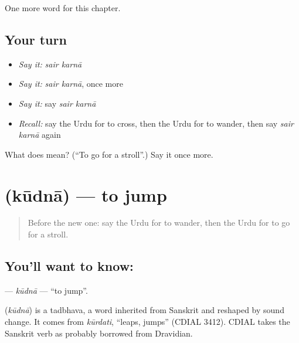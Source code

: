 \begin{grammarlens}[title={What you've built}]
One more word for this chapter.
\end{grammarlens}

\subsection*{Your turn}
\begin{itemize}
\raggedright
  \item \emph{Say it:} \emph{sair karnā}
  \item \emph{Say it:} \emph{sair karnā}, once more
  \item \emph{Say it:} say \emph{sair karnā}
  \item \emph{Recall:} say the Urdu for to cross, then the Urdu for to wander, then say \emph{sair karnā} again
\end{itemize}

\begin{tcolorbox}[breakable,colback=teal!4,colframe=teal!35!black,title={Before you move on}]
What does   mean? (\textquotedblleft{}To go for a stroll\textquotedblright{}.) Say it once more.
\end{tcolorbox}
\section[\texorpdfstring{\ur{کودنا} (kūdnā)}{کودنا (kūdnā)}]{ (kūdnā) — to jump}

\label{lesson:UR-C149-kudna}



\begin{quote}
Before the new one: say the Urdu for to wander, then the Urdu for to go for a stroll.
\end{quote}

\subsection*{You'll want to know: }
\textbf{} — \emph{kūdnā} — \textquotedblleft{}to jump\textquotedblright{}.

\begin{cousinweb}
\textbf{} (\emph{kūdnā}) is a tadbhava, a word inherited from Sanskrit and reshaped by sound change. It comes from \emph{kūrdati}, \textquotedblleft{}leaps, jumps\textquotedblright{} (CDIAL 3412). CDIAL takes the Sanskrit verb as probably borrowed from Dravidian.
\end{cousinweb}

